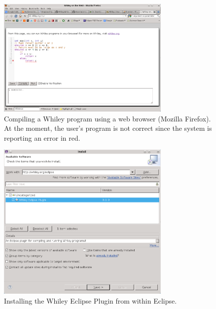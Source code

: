 \begin{figure}[!t]
\centering
\includegraphics[width=0.75\textwidth]{../images/WhileyPlay.png}
\caption{Compiling a Whiley program using a web browser (Mozilla
  Firefox).  At the moment, the user's program is not correct since
  the system is reporting an error in red.}
\label{whileyplay}
\end{figure}

\begin{figure}[!t]
\centering
\includegraphics[width=0.75\textwidth]{../images/WyclipseInstallation.png}
\caption{Installing the Whiley Eclipse Plugin from within Eclipse.}
\label{wyclipseinstall}
\end{figure}

